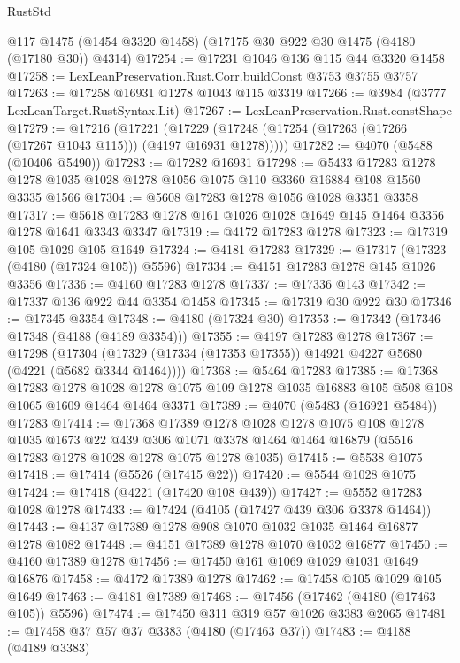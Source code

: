 \begin{lexlean}{RustStd}
\begin{coremodule}
{\begin{coremodule}
{{{{{{{{{{{{{{{{{{{{{{{{{{{{{{{    @117
    @1475
    (@1454 @3320 @1458)
    (@17175 @30 @922 @30 @1475 (@4180 (@17180 @30)) @4314)
@17254 := @17231 @1046 @136 @115 @44 @3320 @1458
@17258 := LexLeanPreservation.Rust.Corr.buildConst @3753 @3755 @3757
@17263 := @17258 @16931 @1278 @1043 @115 @3319
@17266 := @3984 (@3777 LexLeanTarget.RustSyntax.Lit)
@17267 := LexLeanPreservation.Rust.constShape
@17279 := @17216
    (@17221 (@17229 (@17248 (@17254 (@17263 (@17266 (@17267 @1043 @115))) (@4197 @16931 @1278)))))
@17282 := @4070 (@5488 (@10406 @5490))
@17283 := @17282 @16931
@17298 := @5433
    @17283
    @1278
    @1278
    @1035
    @1028
    @1278
    @1056
    @1075
    @110
    @3360
    @16884
    @108
    @1560
    @3335
    @1566
@17304 := @5608 @17283 @1278 @1056 @1028 @3351 @3358
@17317 := @5618 @17283 @1278 @161 @1026 @1028 @1649 @145 @1464 @3356 @1278 @1641 @3343 @3347
@17319 := @4172 @17283 @1278
@17323 := @17319 @105 @1029 @105 @1649
@17324 := @4181 @17283
@17329 := @17317 (@17323 (@4180 (@17324 @105)) @5596)
@17334 := @4151 @17283 @1278 @145 @1026 @3356
@17336 := @4160 @17283 @1278
@17337 := @17336 @143
@17342 := @17337 @136 @922 @44 @3354 @1458
@17345 := @17319 @30 @922 @30
@17346 := @17345 @3354
@17348 := @4180 (@17324 @30)
@17353 := @17342 (@17346 @17348 (@4188 (@4189 @3354)))
@17355 := @4197 @17283 @1278
@17367 := @17298
    (@17304 (@17329 (@17334 (@17353 @17355)) @14921 @4227 @5680 (@4221 (@5682 @3344 @1464))))
@17368 := @5464 @17283
@17385 := @17368
    @17283
    @1278
    @1028
    @1278
    @1075
    @109
    @1278
    @1035
    @16883
    @105
    @508
    @108
    @1065
    @1609
    @1464
    @1464
    @3371
@17389 := @4070 (@5483 (@16921 @5484)) @17283
@17414 := @17368
    @17389
    @1278
    @1028
    @1278
    @1075
    @108
    @1278
    @1035
    @1673
    @22
    @439
    @306
    @1071
    @3378
    @1464
    @1464
    @16879
    (@5516 @17283 @1278 @1028 @1278 @1075 @1278 @1035)
@17415 := @5538 @1075
@17418 := @17414 (@5526 (@17415 @22))
@17420 := @5544 @1028 @1075
@17424 := @17418 (@4221 (@17420 @108 @439))
@17427 := @5552 @17283 @1028 @1278
@17433 := @17424 (@4105 (@17427 @439 @306 @3378 @1464))
@17443 := @4137 @17389 @1278 @908 @1070 @1032 @1035 @1464 @16877 @1278 @1082
@17448 := @4151 @17389 @1278 @1070 @1032 @16877
@17450 := @4160 @17389 @1278
@17456 := @17450 @161 @1069 @1029 @1031 @1649 @16876
@17458 := @4172 @17389 @1278
@17462 := @17458 @105 @1029 @105 @1649
@17463 := @4181 @17389
@17468 := @17456 (@17462 (@4180 (@17463 @105)) @5596)
@17474 := @17450 @311 @319 @57 @1026 @3383 @2065
@17481 := @17458 @37 @57 @37 @3383 (@4180 (@17463 @37))
@17483 := @4188 (@4189 @3383)
}}}}}}}}}}}}}}}}}}}}}}}}}}}}}}}
\end{coremodule}}
\end{coremodule}
\end{lexlean}

